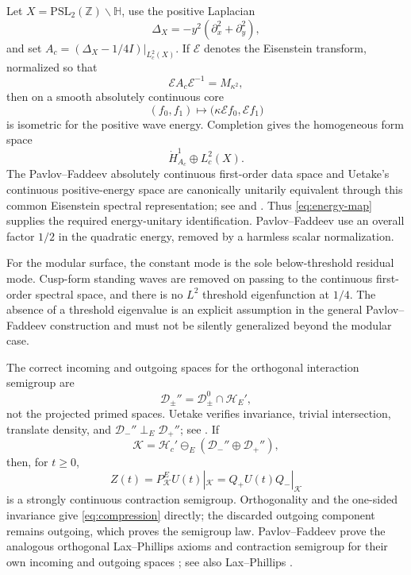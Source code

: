 \documentclass[11pt]{amsart}
\theoremstyle{definition}
\theoremstyle{remark}
\newcommand{\Kcal}{\mathcal K}
\newcommand{\Hcal}{\mathcal H}
\newcommand{\Dcal}{\mathcal D}
\begin{document}
Let $X=\mathrm{PSL}_2(\mathbb Z)\backslash\mathbb H$, use the positive
Laplacian
\[
 \Delta_X=-y^2(\partial_x^2+\partial_y^2),
\]
and set $A_c=(\Delta_X-1/4I)|_{L_c^2(X)}$.  If $\mathcal E$ denotes the Eisenstein
transform, normalized so that
\[
 \mathcal E A_c\mathcal E^{-1}=M_{\kappa^2},
\]
then on a smooth absolutely continuous core
\begin{equation}\label{eq:energy-map}
 (f_0,f_1)\longmapsto
 \bigl(\kappa\mathcal E f_0,\mathcal E f_1\bigr)
\end{equation}
is isometric for the positive wave energy.  Completion gives the homogeneous
form space
\[
 \dot H^1_{A_c}\oplus L_c^2(X).
\]
The Pavlov--Faddeev absolutely continuous first-order data space and Uetake's
continuous positive-energy space are canonically unitarily equivalent through
this common Eisenstein spectral representation; see
\cite[pp.~164--170]{PavlovFaddeev1975} and
\cite[pp.~102--105]{Uetake2007}.  Thus \eqref{eq:energy-map} supplies the
required energy-unitary identification.  Pavlov--Faddeev use an overall
factor $1/2$ in the quadratic energy, removed by a harmless scalar
normalization.

For the modular surface, the constant mode is the sole below-threshold
residual mode.  Cusp-form standing waves are removed on passing to the
continuous first-order spectral space, and there is no $L^2$ threshold
eigenfunction at $1/4$.  The absence of a threshold eigenvalue is an explicit
assumption in the general Pavlov--Faddeev construction and must not be
silently generalized beyond the modular case.

The correct incoming and outgoing spaces for the orthogonal interaction
semigroup are
\[
 \Dcal_\pm''=\Dcal_\pm^0\cap\Hcal_E',
\]
not the projected primed spaces.  Uetake verifies invariance, trivial
intersection, translate density, and
$\Dcal_-''\perp_E\Dcal_+''$; see
\cite[pp.~104--105]{Uetake2007}.  If
\[
 \Kcal=\Hcal_c'\ominus_E(\Dcal_-''\oplus\Dcal_+''),
\]
then, for $t\geq0$,
\begin{equation}\label{eq:compression}
 Z(t)=P^E_{\Kcal}U(t)|_{\Kcal}
     =Q_+U(t)Q_-|_{\Kcal}
\end{equation}
is a strongly continuous contraction semigroup.  Orthogonality and the
one-sided invariance give \eqref{eq:compression} directly; the discarded
outgoing component remains outgoing, which proves the semigroup law.
Pavlov--Faddeev prove the analogous orthogonal Lax--Phillips axioms and
contraction semigroup for their own incoming and outgoing spaces
\cite[pp.~163--175]{PavlovFaddeev1975}; see also Lax--Phillips
\cite[\S5]{LaxPhillips1980}.
\end{document}
